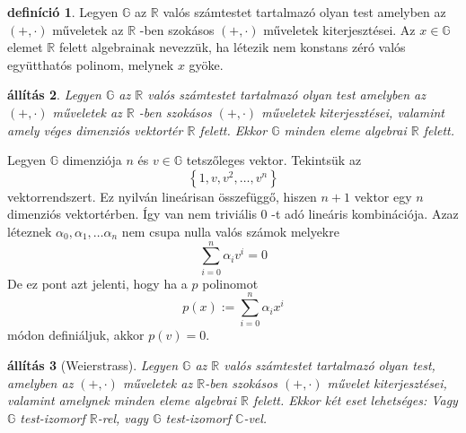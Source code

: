 \documentclass[9pt, showtrims]{memoir}
\makeatletter
\renewenvironment{proof}[1][\proofname]
    {\par\pushQED{\qed}%
    \normalfont \topsep6\p@\@plus6\p@\relax
    \trivlist
    \item[\hskip\labelsep
        \itshape
    #1\@addpunct{:}]\ignorespaces}
    {\popQED\endtrivlist\@endpefalse}
\theoremstyle{plain}
\newtheorem{proposition}{állítás}[section]
\theoremstyle{remark}
\theoremstyle{definition}
\newtheorem{definition}[proposition]{definíció}
\makeatother
\begin{document}
\begin{definition}
Legyen $\mathbb{G}$ az $\mathbb{R}$ valós számtestet tartalmazó olyan
test amelyben az $\left( +,\cdot \right) $ műveletek az $\mathbb{R}$ -ben
szokásos $\left( +,\cdot \right) $ műveletek kiterjesztései.
Az $x\in \mathbb{G}$ elemet $\mathbb{R}$ felett algebrainak nevezzük, ha létezik nem konstans zéró valós együtthatós polinom,
melynek $x$ gyöke.
\end{definition}

\begin{proposition}
Legyen $\mathbb{G}$ az $\mathbb{R}$ valós számtestet tartalmazó olyan
test amelyben az $\left( +,\cdot \right) $ műveletek az $\mathbb{R}$ -ben
szokásos $\left( +,\cdot \right) $ műveletek kiterjesztései,
valamint amely véges dimenziós vektortér $\mathbb{R}$ felett.
Ekkor $\mathbb{G}$ minden eleme algebrai $\mathbb{R}$ felett.
\end{proposition}

\begin{proof}
Legyen $\mathbb{G}$ dimenziója $n$ és $v\in \mathbb{G}$ tetszőleges
vektor.
Tekintsük az 
\[
\left\{ 1,v,v^{2},\ldots ,v^{n}\right\} 
\]
vektorrendszert.
Ez nyilván lineárisan összefüggő,
hiszen $n+1$ vektor egy $n$ dimenziós vektortérben.
\'{I}gy van nem
triviális $0$ -t adó lineáris kombinációja.
Azaz léteznek $\alpha _{0},\alpha _{1},\ldots \alpha _{n}$ nem csupa nulla valós számok melyekre 
\[
\sum_{i=0}^{n}\alpha _{i}v^{i}=0
\]
De ez pont azt jelenti, hogy ha a $p$ polinomot 
\[
p\left( x\right) :=\sum_{i=0}^{n}\alpha _{i}x^{i}
\]
módon definiáljuk, akkor $p\left( v\right) =0$.
\end{proof}

\begin{proposition}[Weierstrass]
Legyen $\mathbb{G}$ az $\mathbb{R}$ valós számtestet tartalmazó olyan
test, amelyben az $\left( +,\cdot \right) $ műveletek az $\mathbb{R}$-ben
szokásos $\left( +,\cdot \right) $ művelet kiterjesztései,
valamint amelynek minden eleme algebrai $\mathbb{R}$ felett.
Ekkor két eset
lehetséges: Vagy $\mathbb{G}$ test-izomorf $\mathbb{R}$-rel, vagy $\mathbb{G}$
test-izomorf $\mathbb{C}$-vel.
\end{proposition}
\end{document}
